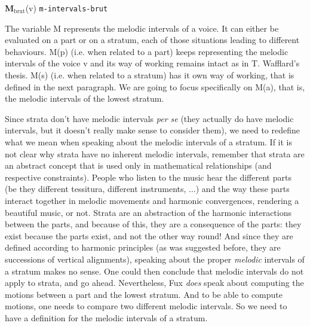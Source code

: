 \vspace{.5cm}
\noindent \textbf{M}$_{\text{brut}}$(v) \hspace*{.2cm} \texttt{m-intervals-brut}

The variable M represents the melodic intervals of a voice. It can either be evaluated on a part or on a stratum, each of those situations leading to different behaviours. M(p) (i.e. when related to a part) keeps representing the melodic intervals of the voice v and its way of working remains intact as in T. Wafflard's thesis. M(s) (i.e. when related to a stratum) has it own way of working, that is defined in the next paragraph. We are going to focus specifically on M(a), that is, the melodic intervals of the lowest stratum.

Since strata don't have melodic intervals \textit{per se} (they actually do have melodic intervals, but it doesn't really make sense to consider them), we need to redefine what we mean when speaking about the melodic intervals of a stratum. If it is not clear why strata have no inherent melodic intervals, remember that strata are an abstract concept that is used only in mathematical relationships (and respective constraints). People who listen to the music hear the different parts (be they different tessitura, different instruments, ...) and the way these parts interact together in melodic movements and harmonic convergences, rendering a beautiful music, or not. Strata are an abstraction of the harmonic interactions between the parts, and because of this, they are a consequence of the parts: they exist because the parts exist, and not the other way round! And since they are defined according to harmonic principles (as was suggested before, they are successions of vertical alignments), speaking about the proper \textit{melodic} intervals of a stratum makes no sense. One could then conclude that melodic intervals do not apply to strata, and go ahead. Nevertheless, Fux \textit{does} speak about computing the motions between a part and the lowest stratum. And to be able to compute motions, one needs to compare two different melodic intervals. So we need to have a definition for the melodic intervals of a stratum. 

